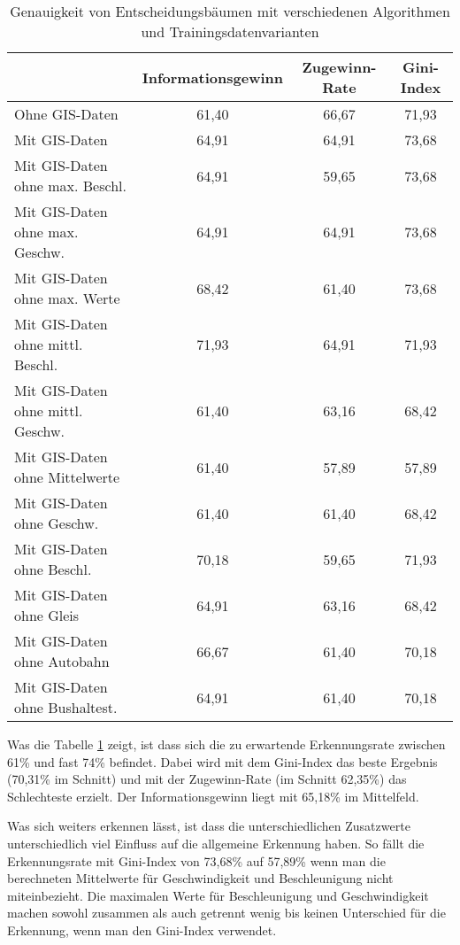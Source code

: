 \begin{table}[h]
\centering
\begin{tabular}{|l|c|c|c|}
\hline
 & {\bf Informationsgewinn} & {\bf Zugewinn-Rate} & {\bf Gini-Index} \\ \hline
Ohne GIS-Daten & 61,40 & 66,67 & 71,93 \\ \hline
Mit GIS-Daten & 64,91 & 64,91 & 73,68 \\ \hline
Mit GIS-Daten ohne max. Beschl. & 64,91 & 59,65 & 73,68 \\ \hline
Mit GIS-Daten ohne max. Geschw. & 64,91 & 64,91 & 73,68 \\ \hline
Mit GIS-Daten ohne max. Werte & 68,42 & 61,40 & 73,68 \\ \hline
Mit GIS-Daten ohne mittl. Beschl. & 71,93 & 64,91 & 71,93 \\ \hline
Mit GIS-Daten ohne mittl. Geschw. & 61,40 & 63,16 & 68,42 \\ \hline
Mit GIS-Daten ohne Mittelwerte & 61,40 & 57,89 & 57,89 \\ \hline
Mit GIS-Daten ohne Geschw. & 61,40 & 61,40 & 68,42 \\ \hline
Mit GIS-Daten ohne Beschl. & 70,18 & 59,65 & 71,93 \\ \hline
Mit GIS-Daten ohne Gleis & 64,91 & 63,16 & 68,42 \\ \hline
Mit GIS-Daten ohne Autobahn & 66,67 & 61,40 & 70,18 \\ \hline
Mit GIS-Daten ohne Bushaltest. & 64,91 & 61,40 & 70,18 \\ \hline
\end{tabular}
\caption{Genauigkeit von Entscheidungsbäumen mit verschiedenen Algorithmen und Trainingsdatenvarianten}
\label{dt-calculation-methods}
\end{table}

Was die Tabelle \ref{dt-calculation-methods} zeigt, ist dass sich die zu erwartende Erkennungsrate zwischen 61\% und fast 74\% befindet. Dabei wird mit dem Gini-Index das beste Ergebnis (70,31\% im Schnitt) und mit der Zugewinn-Rate (im Schnitt 62,35\%) das Schlechteste erzielt. Der Informationsgewinn liegt mit 65,18\% im Mittelfeld.

Was sich weiters erkennen lässt, ist dass die unterschiedlichen Zusatzwerte unterschiedlich viel Einfluss auf die allgemeine Erkennung haben. So fällt die Erkennungsrate mit Gini-Index von 73,68\% auf 57,89\% wenn man die berechneten Mittelwerte für Geschwindigkeit und Beschleunigung nicht miteinbezieht. Die maximalen Werte für Beschleunigung und Geschwindigkeit machen sowohl zusammen als auch getrennt wenig bis keinen Unterschied für die Erkennung,  wenn man den Gini-Index verwendet. 

